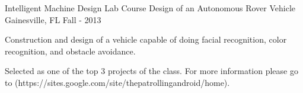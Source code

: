 \begin{cventries}
	\cventry
		{Intelligent Machine Design Lab Course} %
		{Design of an Autonomous Rover Vehicle} %
		{Gainesville, FL} %
		{Fall - 2013} %
		{
			\begin{cvitems} %
				\item {Construction and design of a vehicle capable of doing facial recognition, color recognition, and
					obstacle avoidance.}
				\item {Selected as one of the top 3 projects of the class. For more information please go to
					(https://sites.google.com/site/thepatrollingandroid/home).}
			\end{cvitems}
		}

\end{cventries}
